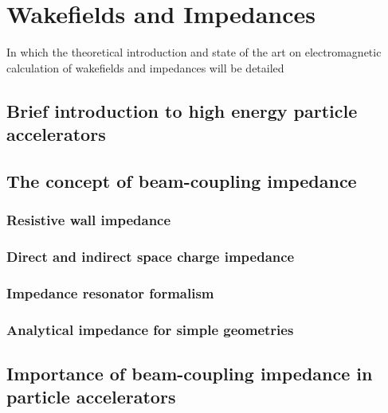 %
\chapter{Wakefields and Impedances}
\label{ch::chapter2}

\begin{center}
  \begin{minipage}{0.5\textwidth}
    \begin{small}
      In which the theoretical introduction and state of the art on electromagnetic calculation of wakefields and impedances will be detailed
    \end{small}
  \end{minipage}
  \vspace{0.5cm}
\end{center}

\section{Brief introduction to high energy particle accelerators}

\section{The concept of beam-coupling impedance}

\subsection{Resistive wall impedance}

\subsection{Direct and indirect space charge impedance}

\subsection{Impedance resonator formalism} %

\subsection{Analytical impedance for simple geometries}

\section{Importance of beam-coupling impedance in particle accelerators}


